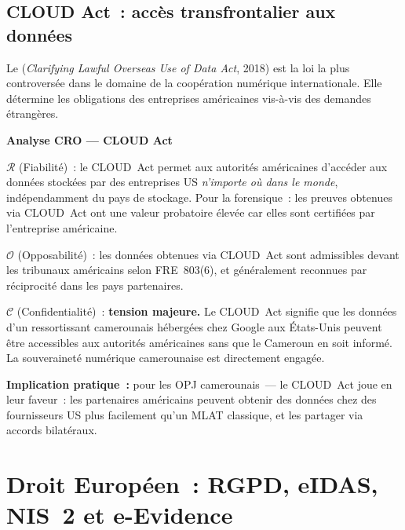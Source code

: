 \subsection{CLOUD Act~: accès transfrontalier aux données}

Le  (\textit{Clarifying Lawful Overseas
Use of Data Act}, 2018) est la loi la plus controversée dans le domaine de
la coopération numérique internationale. Elle détermine les obligations
des entreprises américaines vis-à-vis des demandes étrangères.

\begin{boxCRO}
\textbf{Analyse CRO --- CLOUD Act}

$\mathcal{R}$ (Fiabilité)~: le CLOUD~Act permet aux autorités américaines
d'accéder aux données stockées par des entreprises US \emph{n'importe où
dans le monde}, indépendamment du pays de stockage. Pour la forensique~:
les preuves obtenues via CLOUD~Act ont une valeur probatoire élevée car
elles sont certifiées par l'entreprise américaine.

$\mathcal{O}$ (Opposabilité)~: les données obtenues via CLOUD~Act sont
admissibles devant les tribunaux américains selon FRE~803(6), et
généralement reconnues par réciprocité dans les pays partenaires.

$\mathcal{C}$ (Confidentialité)~: \textbf{tension majeure.} Le CLOUD~Act
signifie que les données d'un ressortissant camerounais hébergées chez
Google aux États-Unis peuvent être accessibles aux autorités américaines
sans que le Cameroun en soit informé. La souveraineté numérique
camerounaise est directement engagée.


\textbf{Implication pratique~:} pour les OPJ camerounais~--- le CLOUD~Act
joue en leur faveur~: les partenaires américains peuvent obtenir des données
chez des fournisseurs US plus facilement qu'un MLAT classique, et les
partager via accords bilatéraux.
\end{boxCRO}

\section{Droit Européen~: RGPD, eIDAS, NIS~2 et e-Evidence}
\label{sec:droit-europe}

